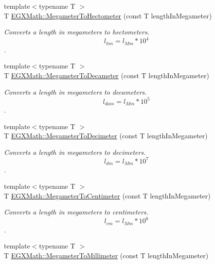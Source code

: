 \begin{DoxyCompactItemize}
{\footnotesize template$<$typename T $>$ }\\T \mbox{\hyperlink{group___e_g_x_math-_conversions-_length_conversions-_megameter-_s_i_gad3460fd29fbb8232307cb7cb7265edce}{E\+G\+X\+Math\+::\+Megameter\+To\+Hectometer}} (const T length\+In\+Megameter)
\begin{DoxyCompactList}\small\item\em Converts a length in megameters to hectometers. \[ l_{hm}=l_{Mm} * 10^{4} \]. \end{DoxyCompactList}\item 
{\footnotesize template$<$typename T $>$ }\\T \mbox{\hyperlink{group___e_g_x_math-_conversions-_length_conversions-_megameter-_s_i_ga7e758185a466f8ac5f956650312b9019}{E\+G\+X\+Math\+::\+Megameter\+To\+Decameter}} (const T length\+In\+Megameter)
\begin{DoxyCompactList}\small\item\em Converts a length in megameters to decameters. \[ l_{dam}=l_{Mm} * 10^{5} \]. \end{DoxyCompactList}\item 
{\footnotesize template$<$typename T $>$ }\\T \mbox{\hyperlink{group___e_g_x_math-_conversions-_length_conversions-_megameter-_s_i_gaf63f319e0852676dab85aaebc462e8a3}{E\+G\+X\+Math\+::\+Megameter\+To\+Decimeter}} (const T length\+In\+Megameter)
\begin{DoxyCompactList}\small\item\em Converts a length in megameters to decimeters. \[ l_{dm}=l_{Mm} * 10^{7} \]. \end{DoxyCompactList}\item 
{\footnotesize template$<$typename T $>$ }\\T \mbox{\hyperlink{group___e_g_x_math-_conversions-_length_conversions-_megameter-_s_i_gacbe2b41169d39f02fb70baedf0f8a9c4}{E\+G\+X\+Math\+::\+Megameter\+To\+Centimeter}} (const T length\+In\+Megameter)
\begin{DoxyCompactList}\small\item\em Converts a length in megameters to centimeters. \[ l_{cm}=l_{Mm} * 10^{8} \]. \end{DoxyCompactList}\item 
{\footnotesize template$<$typename T $>$ }\\T \mbox{\hyperlink{group___e_g_x_math-_conversions-_length_conversions-_megameter-_s_i_ga8fd5a24935e05ff3f6e0f7e35379357f}{E\+G\+X\+Math\+::\+Megameter\+To\+Millimeter}} (const T length\+In\+Megameter)

\end{DoxyCompactItemize}

